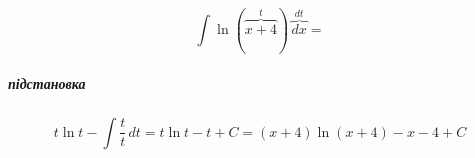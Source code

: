 \documentclass[../rgr1.tex]{subfiles}
\begin{document}
\Solution

\begin{equation}
	\int \ln(\overbrace{x+4}^t)\, \overbrace{dx}^{dt} =
\end{equation}

\subparagraph{підстановка}
\noindent\begin{varwidth}{\linewidth}
\end{varwidth}
\begin{equation}
	t \ln t - \int \frac{t}{t}\, dt =
	t\ln t - t + C =
	(x+4)\ln (x+4) - x-4 + C
\end{equation}

\end{document}
